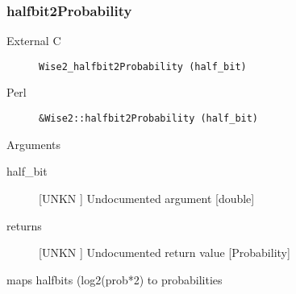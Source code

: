 \subsubsection{halfbit2Probability}
\begin{description}
\item[External C] {\tt Wise2_halfbit2Probability (half_bit)}
\item[Perl] {\tt &Wise2::halfbit2Probability (half_bit)}

\end{description}
Arguments
\begin{description}
\item[half_bit] [UNKN ] Undocumented argument [double]
\item[returns] [UNKN ] Undocumented return value [Probability]
\end{description}
maps halfbits (log2(prob*2) to
probabilities




